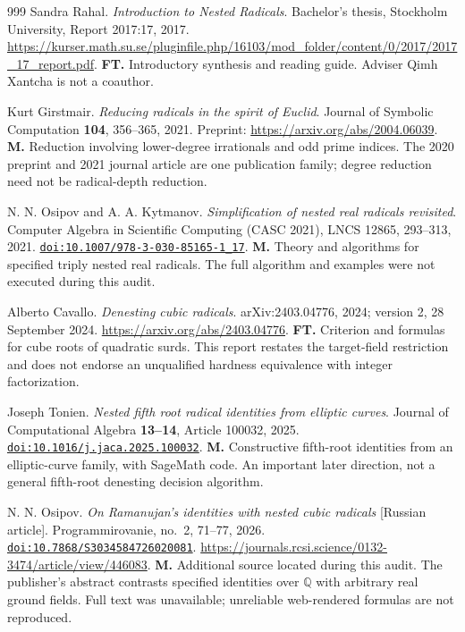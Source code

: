 \documentclass[11pt,a4paper]{article}
\newcommand{\Q}{\mathbb{Q}}
\newcommand{\doi}[1]{\href{https://doi.org/#1}{\nolinkurl{doi:#1}}}
\let\sourceurl\url
\theoremstyle{definition}
\theoremstyle{remark}
\numberwithin{equation}{section}
\begin{document}
\begin{thebibliography}{999}
Sandra Rahal.
\emph{Introduction to Nested Radicals}.
Bachelor's thesis, Stockholm University, Report 2017:17, 2017.
\sourceurl{https://kurser.math.su.se/pluginfile.php/16103/mod_folder/content/0/2017/2017_17_report.pdf}.
\textbf{FT.} Introductory synthesis and reading guide. Adviser Qimh Xantcha is not a coauthor.

Kurt Girstmair.
\emph{Reducing radicals in the spirit of Euclid}.
Journal of Symbolic Computation \textbf{104}, 356--365, 2021.
Preprint: \sourceurl{https://arxiv.org/abs/2004.06039}.
\textbf{M.} Reduction involving lower-degree irrationals and odd prime indices. The 2020 preprint and 2021 journal article are one publication family; degree reduction need not be radical-depth reduction.

N. N. Osipov and A. A. Kytmanov.
\emph{Simplification of nested real radicals revisited}.
Computer Algebra in Scientific Computing (CASC 2021), LNCS 12865, 293--313, 2021.
\doi{10.1007/978-3-030-85165-1_17}.
\textbf{M.} Theory and algorithms for specified triply nested real radicals. The full algorithm and examples were not executed during this audit.

Alberto Cavallo.
\emph{Denesting cubic radicals}.
arXiv:2403.04776, 2024; version 2, 28 September 2024.
\sourceurl{https://arxiv.org/abs/2403.04776}.
\textbf{FT.} Criterion and formulas for cube roots of quadratic surds. This report restates the target-field restriction and does not endorse an unqualified hardness equivalence with integer factorization.

Joseph Tonien.
\emph{Nested fifth root radical identities from elliptic curves}.
Journal of Computational Algebra \textbf{13--14}, Article 100032, 2025.
\doi{10.1016/j.jaca.2025.100032}.
\textbf{M.} Constructive fifth-root identities from an elliptic-curve family, with SageMath code. An important later direction, not a general fifth-root denesting decision algorithm.

N. N. Osipov.
\emph{On Ramanujan's identities with nested cubic radicals} [Russian article].
Programmirovanie, no.~2, 71--77, 2026.
\doi{10.7868/S3034584726020081}.
\sourceurl{https://journals.rcsi.science/0132-3474/article/view/446083}.
\textbf{M.} Additional source located during this audit. The publisher's abstract contrasts specified identities over $\Q$ with arbitrary real ground fields. Full text was unavailable; unreliable web-rendered formulas are not reproduced.


\end{thebibliography}
\end{document}

